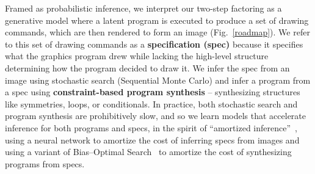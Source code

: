 \documentclass{article}
\theoremstyle{definition}
\begin{document}
 Framed as probabilistic inference,
we interpret our two-step factoring  as a generative model where a latent program
 is executed to produce a set of drawing commands,
 which are then rendered to form an image (Fig.~\ref{roadmap}).
 We refer to this set of drawing commands as a \textbf{specification (spec)} because it specifies what the graphics program drew while lacking the high-level structure determining how the program decided to draw it.
 We infer the spec from an image using stochastic search (Sequential Monte Carlo)
 and infer a program from a spec using  \textbf{constraint-based program synthesis} \citep{solar2008program} --
 synthesizing structures like symmetries, loops, or conditionals.
 In practice, both stochastic search and program synthesis are
 prohibitively slow,
 and so we learn models that accelerate inference for both programs and specs,
 in the spirit of ``amortized inference''~\cite{paige2016inference},
 using a neural network to amortize the cost of inferring specs from images and using
 a variant of Bias--Optimal Search~\cite{schmidhuber2004optimal}
 to amortize the cost of synthesizing programs from specs.
\end{document}
